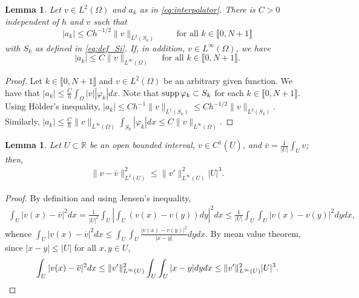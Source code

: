\documentclass[11 pt]{article}
\newcommand\inter[1]{\llbracket #1\rrbracket}
\newtheorem{lemma}[theorem]{Lemma}
\numberwithin{equation}{section}
\def\R{\mathbb{R}}
\begin{document}
%
\begin{lemma}\label{lem:bounds_aks}
Let $v\in L^2(\Omega)$ and $a_k$ as in \eqref{eq:interpolator}. There is $C>0$ independent of $h$ and $v$ such that
%
\begin{equation}\label{eq:est_ak_H}
    |a_k|\leq C h^{-1/2} \|v\|_{L^2(S_k)}\qquad \text{ for all } k\in\inter{0,N+1}
\end{equation}
%
with $S_k$ as defined in \eqref{eq:def_Si}. If, in addition, $v\in L^\infty(\Omega)$, we have
\begin{equation}\label{eq:est_ak_Linf}
    |a_k|\leq C \|v\|_{L^\infty(\Omega)} \quad\text{ for all } k\in\inter{0,N+1}.
\end{equation}
\end{lemma}
%
\begin{proof}
Let $k\in\inter{0,N+1}$ and $v\in L^2(\Omega)$ be an arbitrary given function. We have that $|a_k|\leq \frac{C}{h}\int_{\Omega}|v||\varphi_k|dx.$ Note that $\textnormal{supp}\,\varphi_k\subset S_k$ for each $k\in\inter{0,N+1}$. Using H\"older's inequality, $|a_k|\leq C h^{-1}\|v\|_{L^1(S_k)}\leq Ch^{-1/2}\|v\|_{L^2(S_k)}.$ Similarly,   $|a_k|\leq \frac{C}{h}\|v\|_{L^\infty(\Omega)}\int_{S_k}|\varphi_k| dx \leq C\|v\|_{L^\infty(\Omega)}.$
\end{proof}

\begin{lemma}\label{lem:poincare_type}
Let $U\subset \R$ be an open bounded interval, $v\in C^1(\overline{U})$, and $\overline v=\frac{1}{|U|}\int_{U}v$; then,
\begin{align*}
\|v-\overline{v}\|_{L^2(U)}^2\leq \|v'\|^2_{L^\infty(U)}|U|^3.
\end{align*}
\end{lemma}
%
\begin{proof}
By definition and using Jensen's inequality,
%
\begin{align*}
    \int_{U}|v(x)-\overline{v}|^2dx=\frac{1}{|U|^2}\int_{U}\left|\int_{U}(v(x)-v(y))dy\right|^2dx \leq \frac{1}{|U|}\int_{U}\int_{U}|v(x)-v(y)|^2dy dx,
\end{align*}
%
whence $\int_{U}|v(x)-\overline{v}|^2dx \leq \int_{U}\int_{U}\frac{|v(x)-v(y)|^2}{|x-y|}dy dx.$ By mean value theorem, since $|x-y|\leq |U|$ for all $x,y\in U$,
%
\begin{equation*}
    \int_{U}|v(x)-\overline{v}|^2dx 
    \leq \|v'\|^2_{L^\infty(U)}\int_{U}\int_{U}|x-y|dy dx
    \leq \|v'\|^2_{L^\infty(U)}|U|^3.\qedhere
\end{equation*}
\end{proof}
\end{document}
